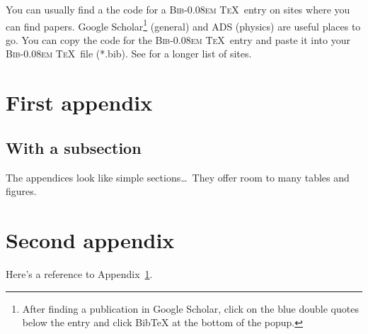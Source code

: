 \documentclass[11pt]{article}  %
\DeclareRobustCommand{\BibTeX}{{\normalfont\scshape Bib\kern-0.08em \TeX}}
\begin{document}
You can usually find a the code for a \BibTeX\ entry on sites where you can find papers.  Google
Scholar\footnote{After finding a publication in Google Scholar, click on the blue double quotes below the
  entry and click BibTeX at the bottom of the popup.}  (general) and ADS (physics) are useful places to go.
You can copy the code for the \BibTeX\ entry and paste it into your \BibTeX\ file (*.bib).  See
\cite{BibTeXentries} for a longer list of sites.


\begin{appendices}  %
  \section{First appendix}
  \label{app:firstApp}
  
  \subsection*{With a subsection}
  
  The appendices look like simple sections\ldots\
  They offer room to many tables and figures.
  
  
  \section{Second appendix}
  Here's a reference to Appendix~\ref{app:firstApp}.
  
\end{appendices}



\end{document}
